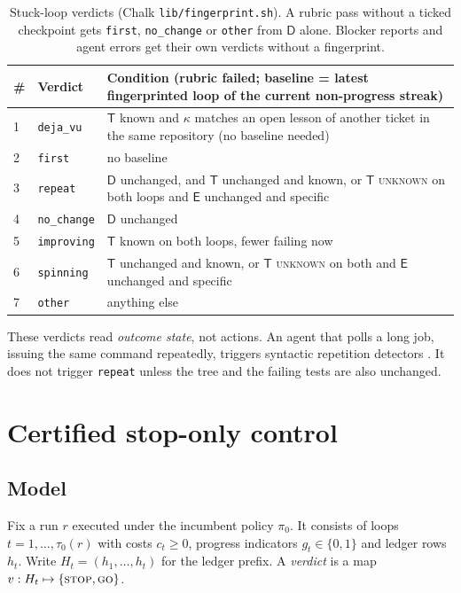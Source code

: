 \documentclass[11pt]{article}
\theoremstyle{remark}
\newcommand{\Tset}{\mathsf{T}}
\newcommand{\Eerr}{\mathsf{E}}
\newcommand{\Dtree}{\mathsf{D}}
\begin{document}
\begin{table}[t]
\centering\small
\begin{tabularx}{\linewidth}{@{}llX@{}}
\toprule
\# & Verdict & Condition (rubric failed; baseline = latest fingerprinted loop of the current non-progress streak) \\
\midrule
1 & \texttt{deja\_vu} & $\Tset$ known and $\kappa$ matches an open lesson of another ticket in the same repository (no baseline needed) \\
2 & \texttt{first} & no baseline \\
3 & \texttt{repeat} & $\Dtree$ unchanged, and $\Tset$ unchanged and known, or $\Tset$ \textup{\textsc{unknown}} on both loops and $\Eerr$ unchanged and specific \\
4 & \texttt{no\_change} & $\Dtree$ unchanged \\
5 & \texttt{improving} & $\Tset$ known on both loops, fewer failing now \\
6 & \texttt{spinning} & $\Tset$ unchanged and known, or $\Tset$ \textup{\textsc{unknown}} on both and $\Eerr$ unchanged and specific \\
7 & \texttt{other} & anything else \\
\bottomrule
\end{tabularx}
\caption{Stuck-loop verdicts (Chalk \texttt{lib/fingerprint.sh}). A rubric pass without a ticked checkpoint gets \texttt{first}, \texttt{no\_change} or \texttt{other} from $\Dtree$ alone. Blocker reports and agent errors get their own verdicts without a fingerprint.}
\label{tab:verdicts}
\end{table}

These verdicts read \emph{outcome state}, not actions. An agent that polls a long job, issuing the same command repeatedly, triggers syntactic repetition detectors \citep{openhands2026issue762}. It does not trigger \texttt{repeat} unless the tree and the failing tests are also unchanged.

\section{Certified stop-only control}
\label{sec:stop}

\subsection{Model}

Fix a run $r$ executed under the incumbent policy $\pi_0$. It consists of loops $t=1,\dots,\tau_0(r)$ with costs $c_t\ge 0$, progress indicators $g_t\in\{0,1\}$ and ledger rows $h_t$. Write $H_t=(h_1,\dots,h_t)$ for the ledger prefix. A \emph{verdict} is a map $v:H_t\mapsto\{\textup{\textsc{stop}},\textup{\textsc{go}}\}$.
\end{document}
